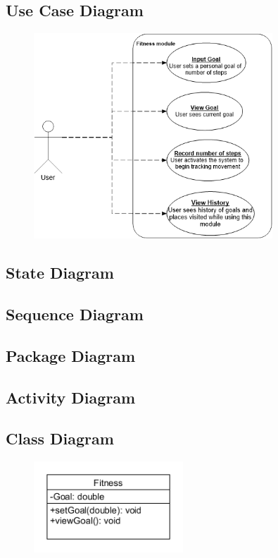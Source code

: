\subsection{Use Case Diagram}
\begin{figure} [ht]
  \includegraphics[width=0.8\textwidth]{Fitness/FitnessUseCase.png}
\end{figure}

\subsection{State Diagram}

\subsection{Sequence Diagram}

\subsection{Package Diagram}

\subsection{Activity Diagram}

\subsection{Class Diagram}
\begin{figure} 
  \includegraphics[width=0.5\textwidth]{Fitness/FitnessClassDgm.png}
\end{figure}
